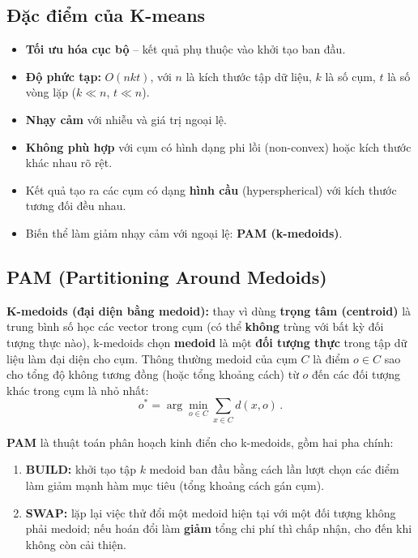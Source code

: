 \documentclass[10pt]{article}
\begin{document}
\subsection{Đặc điểm của K-means}

\begin{itemize}
    \item \textbf{Tối ưu hóa cục bộ} -- kết quả phụ thuộc vào khởi tạo ban đầu.
    \item \textbf{Độ phức tạp:} $O(nkt)$, với $n$ là kích thước tập dữ liệu, $k$ là số cụm, $t$ là số vòng lặp ($k \ll n$, $t \ll n$).
    \item \textbf{Nhạy cảm} với nhiễu và giá trị ngoại lệ.
    \item \textbf{Không phù hợp} với cụm có hình dạng phi lồi (non-convex) hoặc kích thước khác nhau rõ rệt.
    \item Kết quả tạo ra các cụm có dạng \textbf{hình cầu} (hyperspherical) với kích thước tương đối đều nhau.
    \item Biến thể làm giảm nhạy cảm với ngoại lệ: \textbf{PAM (k-medoids)}.
\end{itemize}

\subsection{PAM (Partitioning Around Medoids)}
\label{sec:pam-kmedoids}

\textbf{K-medoids (đại diện bằng medoid):} thay vì dùng \textbf{trọng tâm (centroid)} là trung bình số học các vector trong cụm (có thể \textbf{không} trùng với bất kỳ đối tượng thực nào), k-medoids chọn \textbf{medoid} là một \textbf{đối tượng thực} trong tập dữ liệu làm đại diện cho cụm. Thông thường medoid của cụm $C$ là điểm $o \in C$ sao cho tổng độ không tương đồng (hoặc tổng khoảng cách) từ $o$ đến các đối tượng khác trong cụm là nhỏ nhất:
\[
o^* = \arg\min_{o \in C} \sum_{x \in C} d(x,o)\,.
\]

\textbf{PAM} là thuật toán phân hoạch kinh điển cho k-medoids, gồm hai pha chính:
\begin{enumerate}
    \item \textbf{BUILD:} khởi tạo tập $k$ medoid ban đầu bằng cách lần lượt chọn các điểm làm giảm mạnh hàm mục tiêu (tổng khoảng cách gán cụm).
    \item \textbf{SWAP:} lặp lại việc thử đổi một medoid hiện tại với một đối tượng không phải medoid; nếu hoán đổi làm \textbf{giảm} tổng chi phí thì chấp nhận, cho đến khi không còn cải thiện.
\end{enumerate}
\end{document}
